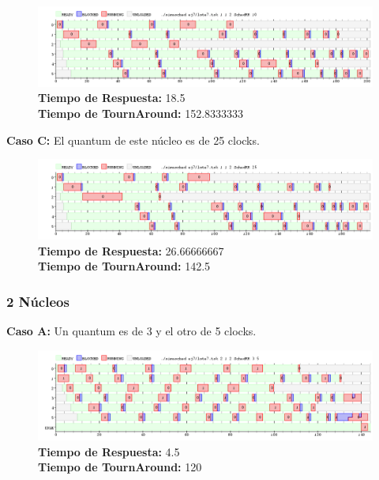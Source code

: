 \documentclass[a4paper]{article}
\begin{document}
		 \begin{figure}[h!]
   \begin{center}
 	\includegraphics[scale=0.5]{imagenes/ej7/1nucleoB.png}
 	\textbf{Tiempo de Respuesta:} 18.5 \\
 	\textbf{Tiempo de TournAround:} 152.8333333\\
   \end{center}
 \end{figure} 
	
	\textbf{Caso C:} El quantum de este n\'ucleo es de 25 clocks.

		 \begin{figure}[h!]
   \begin{center}
 	\includegraphics[scale=0.5]{imagenes/ej7/1nucleoC.png}
 	\textbf{Tiempo de Respuesta:} 26.66666667 \\
 	\textbf{Tiempo de TournAround:} 142.5 \\
   \end{center}
 \end{figure} 	
	
\newpage	
	\subsubsection*{2 N\'ucleos}
	
	\textbf{Caso A:} Un quantum es de 3 y el otro de 5 clocks.

		 \begin{figure}[h!]
   \begin{center}
 	\includegraphics[scale=0.5]{imagenes/ej7/2nucleoA.png}
 	\textbf{Tiempo de Respuesta:} 4.5 \\
 	\textbf{Tiempo de TournAround:} 120 \\
   \end{center}
 \end{figure} 
 	
\end{document}
